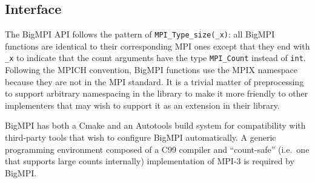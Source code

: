 
\subsection{Interface}

The BigMPI API follows the pattern of \texttt{MPI\_Type\_size(\_x)}: 
all BigMPI functions are identical to their corresponding MPI ones except that
they end with \texttt{\_x} to indicate that the count arguments have the type
\texttt{MPI\_Count} instead of \texttt{int}.
Following the MPICH convention, BigMPI functions use the 
MPIX namespace because they are not in the MPI standard.
It is a trivial matter of preprocessing to support arbitrary namespacing
in the library to make it more friendly to other implementers that
may wish to support it as an extension in their library.


BigMPI has both a Cmake and an Autotools build system for compatibility
with third-party tools that wish to configure BigMPI automatically.
A generic programming environment composed of a C99 compiler 
and ``count-safe'' (i.e.\  one that supports large counts internally) 
implementation of MPI-3 is required by BigMPI.
